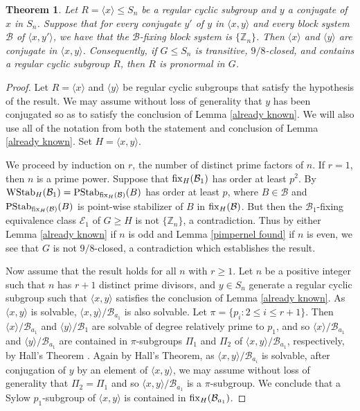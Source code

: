 \documentclass{amsart}
\newtheorem{thrm}{Theorem}[section]
\theoremstyle{definition}
\theoremstyle{remark}
\numberwithin{equation}{section}
\def\Z{{\mathbb Z}}
\def\la{{\langle}}
\def\ra{{\rangle}}
\def\fix{{\rm fix}}
\def\cal{\mathcal}
\def\PStab{{\rm PStab}}
\def\WStab{{\rm WStab}}
\begin{document}
\begin{thrm}\label{configuration result}
Let $R = \la x\ra\le S_n$ be a regular cyclic subgroup and $y$ a conjugate of $x$ in $S_n$.  Suppose that for every conjugate $y'$ of $y$ in $\la x,y\ra$ and every block system ${\cal B}$ of $\la x,y'\ra$, we have that the ${\cal B}$-fixing block system is $\{\Z_n\}$.  Then $\la x\ra$ and $\la y\ra$ are conjugate in $\la x,y\ra$.  Consequently, if $G\le S_n$ is transitive, $9/8$-closed, and contains a regular cyclic subgroup $R$, then $R$ is pronormal in $G$.
\end{thrm}

\begin{proof}
Let $R = \la x\ra$ and $\la y\ra$ be regular cyclic subgroups that satisfy the hypothesis of the result.  We may assume without loss of generality that $y$ has been conjugated so as to satisfy the conclusion of Lemma \ref{already known}.  We will also use all of the notation from both the statement and conclusion of Lemma \ref{already known}.  Set $H = \la x,y\ra$.

We proceed by induction on $r$, the number of distinct prime factors of $n$.  If $r = 1$, then $n$ is a prime power. Suppose that $\fix_H({\cal B}_1)$ has order at least $p^2$.  By \cite[Lemma 1.24]{Dobson2023apreprint} $\WStab_H({\cal B}_1) = \PStab_{\fix_H({\cal B})}(B)$ has order at least $p$, where $B\in{\cal B}$ and $\PStab_{\fix_H({\cal B})}(B)$ is point-wise stabilizer of $B$ in $\fix_H({\cal B})$.  But then the ${\cal B}_1$-fixing equivalence class ${\cal E}_1$ of $G\ge H$ is not $\{\Z_n\}$, a contradiction.  Thus by either Lemma \ref{already known} if $n$ is odd and Lemma \ref{pimpernel found} if $n$ is even, we see that $G$ is not $9/8$-closed, a contradiction which establishes the result.

Now assume that the result holds for all $n$ with $r\ge 1$.  Let $n$ be a positive integer such that $n$ has $r+1$ distinct prime divisors, and $y\in S_n$ generate a regular cyclic subgroup such that $\la x,y\ra$ satisfies the conclusion of Lemma \ref{already known}.  As $\la x,y\ra$ is solvable, $\la x,y\ra/{\cal B}_{a_1}$ is also solvable.  Let $\pi = \{p_i:2\le i\le r + 1\}$.  Then $\la x\ra/{\cal B}_{a_1}$ and $\la y\ra/{\cal B}_1$ are solvable of degree relatively prime to $p_1$, and so $\la x\ra/{\cal B}_{a_1}$ and $\la y\ra/{\cal B}_{a_1}$ are contained in $\pi$-subgroups $\Pi_1$ and $\Pi_2$ of $\la x,y\ra/{\cal B}_{a_1}$, respectively, by Hall's Theorem \cite[Proposition 7.14]{Hungerford1980}. Again by Hall's Theorem, as $\la x,y\ra/{\cal B}_{a_i}$ is solvable, after conjugation of $y$ by an element of $\la x,y\ra$, we may assume without loss of generality that $\Pi_2 = \Pi_1$ and so $\la x,y\ra/{\cal B}_{a_1}$ is a $\pi$-subgroup.  We conclude that a Sylow $p_1$-subgroup of $\la x,y\ra$ is contained in $\fix_H({\cal B}_{a_1})$.


\end{proof}
\end{document}
